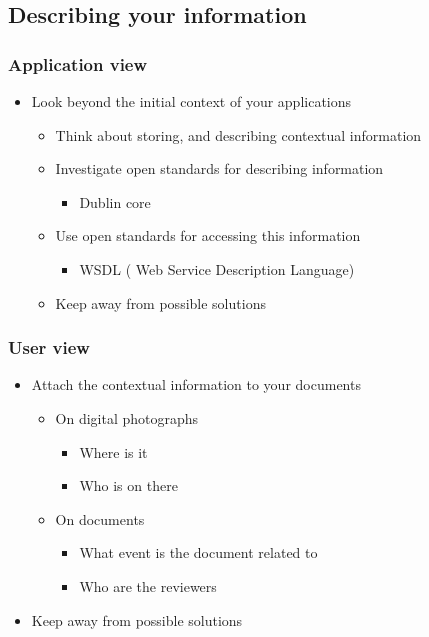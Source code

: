 \documentclass{beamer}
\begin{document}
\subsection[Describing your information]{Describing your information}

\begin{frame}
\frametitle{Application view}

\begin{itemize}
  \item Look beyond the initial context of your applications 
  \begin{itemize}
    \item Think about storing, and describing contextual information
    \item Investigate open standards for describing information
    \begin{itemize}
      \item Dublin core     
    \end{itemize} 
    \item Use open standards for accessing this information
    \begin{itemize}
      \item WSDL ( Web Service Description Language)
    \end{itemize}
    \item Keep away from possible solutions  
  \end{itemize}
\end{itemize}

\end{frame}

\begin{frame}
\frametitle{User view}

\begin{itemize}
  \item Attach the contextual information to your documents 
  \begin{itemize}
    \item On digital photographs
    \begin{itemize}
      \item Where is it
      \item Who is on there     
    \end{itemize} 
    \item On documents
    \begin{itemize}
      \item What event is the document related to
      \item Who are the reviewers
    \end{itemize}
  \end{itemize}
  \item Keep away from possible solutions
\end{itemize}

\end{frame}
\end{document}
